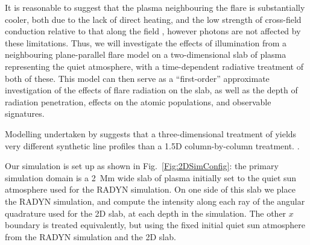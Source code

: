 It is reasonable to suggest that the plasma neighbouring the flare is substantially cooler, both due to the lack of direct heating, and the low strength of cross-field conduction relative to that along the field \citep{Spitzer1953}, however photons are not affected by these limitations.
Thus, we will investigate the effects of illumination from a neighbouring plane-parallel flare model on a two-dimensional slab of plasma representing the quiet atmosphere, with a time-dependent radiative treatment of both of these.
This model can then serve as a ``first-order'' approximate investigation of the effects of flare radiation on the slab, as well as the depth of radiation penetration, effects on the atomic populations, and observable signatures.

Modelling undertaken by \citet{Leenaarts2012a} suggests that a three-dimensional treatment of \Ha{} yields very different synthetic line profiles than a 1.5D column-by-column treatment.
.

Our simulation is set up as shown in Fig.~\ref{Fig:2DSimConfig}: the primary simulation domain is a \SI{2}{\mega\metre} wide slab of plasma initially set to the quiet sun atmosphere used for the RADYN simulation.
On one side of this slab we place the RADYN simulation, and compute the intensity along each ray of the angular quadrature used for the 2D slab, at each depth in the simulation.
The other $x$ boundary is treated equivalently, but using the fixed initial quiet sun atmosphere from the RADYN simulation and the 2D slab.

